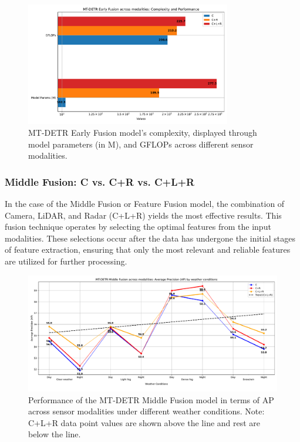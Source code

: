 \documentclass[report.tex]{subfiles}
\begin{document}
        \begin{figure}[]
            \centering
            \includegraphics[width=0.8\textwidth]{images/results/mtdetr/early/model_complexity.pdf}
            \caption{MT-DETR Early Fusion model's complexity, displayed through model parameters (in M), and GFLOPs across different sensor modalities.}
            \label{fig:mtdetr_early_model_complexity}
        \end{figure}

    \FloatBarrier
    \subsubsection{Middle Fusion: C vs. C+R vs. C+L+R}

    In the case of the Middle Fusion or Feature Fusion model, the combination of Camera, LiDAR, and Radar (C+L+R) yields the most effective results. This fusion technique operates by selecting the optimal features from the input modalities. These selections occur after the data has undergone the initial stages of feature extraction, ensuring that only the most relevant and reliable features are utilized for further processing.

    \begin{figure}[h!]
        \centering
        \includegraphics[width=1.0\textwidth]{images/results/mtdetr/middle/ap.pdf}
        \caption{Performance of the MT-DETR Middle Fusion model in terms of AP across sensor modalities under different weather conditions. Note: C+L+R data point values are shown above the line and rest are below the line.}
        \label{fig:mtdetr_middle_ap}
    \end{figure}
\end{document}
